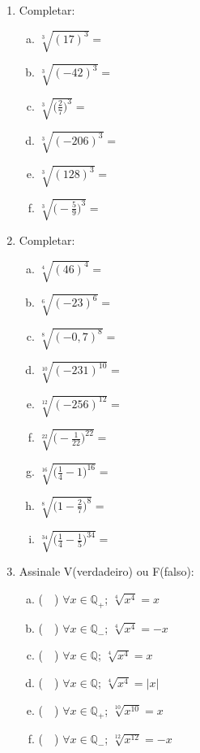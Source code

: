 \documentclass[a4paper,14pt]{article}
\begin{document}
\begin{multicols}{2}
\begin{enumerate}
        \item Completar:
		\begin{enumerate}[a)]
        	\item $\sqrt[3]{(17)^3} = $
        	\item $\sqrt[3]{(-42)^3} = $
        	\item $\sqrt[3]{\bigg( \frac{2}{7} \bigg)^3 } = $
        	\item $\sqrt[3]{(-206)^3} = $
        	\item $\sqrt[3]{(128)^3} = $
        	\item $\sqrt[3]{\bigg(- \frac{5}{9} \bigg)^3 } = $
        \end{enumerate}
        \item Completar:
        \begin{enumerate}[a)]
        	\item $\sqrt[4]{(46)^4} = $
        	\item $\sqrt[6]{(-23)^6} = $
        	\item $\sqrt[8]{(-0,7)^8} = $
        	\item $\sqrt[10]{(-231)^{10}} = $
        	\item $\sqrt[12]{(-256)^{12}} = $
        	\item $\sqrt[22]{\bigg(- \frac{1}{22} \bigg)^{22} } = $
        	\item $\sqrt[16]{\bigg( \frac{1}{4}-1 \bigg)^{16} } = $
        	\item $\sqrt[8]{\bigg( 1 - \frac{2}{7} \bigg)^8 } = $
        	\item $\sqrt[34]{\bigg( \frac{1}{4} - \frac{1}{5} \bigg)^{34} } = $
        \end{enumerate}
        \item Assinale V(verdadeiro) ou F(falso):
        \begin{enumerate}[a)]
        	\item (~~) $\forall x \in \mathbb{Q_+}$; $\sqrt[4]{x^4} = x$
        	\item (~~) $\forall x \in \mathbb{Q_-}$; $\sqrt[4]{x^4} = -x$
        	\item (~~) $\forall x \in \mathbb{Q}$; $\sqrt[4]{x^4} = x$
        	\item (~~) $\forall x \in \mathbb{Q}$; $\sqrt[4]{x^4} = |x|$
        	\item (~~) $\forall x \in \mathbb{Q_+}$; $\sqrt[10]{x^{10}} = x$
        	\item (~~) $\forall x \in \mathbb{Q_-}$; $\sqrt[12]{x^{12}} = -x$
        \end{enumerate}        
    \end{enumerate}        
    \end{multicols}    
\end{document}
